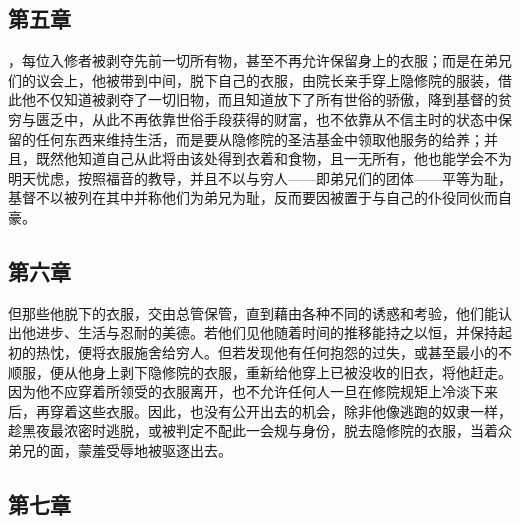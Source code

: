 
\subsection{第五章}

\par

，每位入修者被剥夺先前一切所有物，甚至不再允许保留身上的衣服；而是在弟兄们的议会上，他被带到中间，脱下自己的衣服，由院长亲手穿上隐修院的服装，借此他不仅知道被剥夺了一切旧物，而且知道放下了所有世俗的骄傲，降到基督的贫穷与匮乏中，从此不再依靠世俗手段获得的财富，也不依靠从不信主时的状态中保留的任何东西来维持生活，而是要从隐修院的圣洁基金中领取他服务的给养；并且，既然他知道自己从此将由该处得到衣着和食物，且一无所有，他也能学会不为明天忧虑，按照福音的教导，并且不以与穷人——即弟兄们的团体——平等为耻，基督不以被列在其中并称他们为弟兄为耻，反而要因被置于与自己的仆役同伙而自豪。\par


\subsection{第六章}

\par

但那些他脱下的衣服，交由总管保管，直到藉由各种不同的诱惑和考验，他们能认出他进步、生活与忍耐的美德。若他们见他随着时间的推移能持之以恒，并保持起初的热忱，便将衣服施舍给穷人。但若发现他有任何抱怨的过失，或甚至最小的不顺服，便从他身上剥下隐修院的衣服，重新给他穿上已被没收的旧衣，将他赶走。因为他不应穿着所领受的衣服离开，也不允许任何人一旦在修院规矩上冷淡下来后，再穿着这些衣服。因此，也没有公开出去的机会，除非他像逃跑的奴隶一样，趁黑夜最浓密时逃脱，或被判定不配此一会规与身份，脱去隐修院的衣服，当着众弟兄的面，蒙羞受辱地被驱逐出去。\par


\subsection{第七章}

